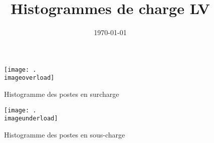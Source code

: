\documentclass{article}
\title{Histogrammes de charge LV}
\date{\today}
\begin{document}
\maketitle

\begin{figure}
    \caption{Histogramme des postes en surcharge}
    \centering
    \texttt{[image: .\\imageoverload]}
\end{figure}

\begin{figure}
    \caption{Histogramme des postes en sous-charge}
    \centering
    \texttt{[image: .\\imageunderload]}
\end{figure}
\end{document}
